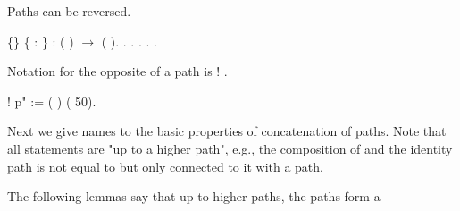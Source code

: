 \documentclass[12pt]{report}
\begin{document}
Paths can be reversed. \begin{coqdoccode}
\coqdocemptyline
\coqdocnoindent
{}  \{\} \{  : \} : (  ) \ensuremath{\rightarrow} (  ).\coqdoceol
\coqdocnoindent
{}.\coqdoceol
\coqdocindent{1.00em}
    .\coqdoceol
\coqdocindent{1.00em}
 .\coqdoceol
\coqdocindent{1.00em}
 .\coqdoceol
\coqdocnoindent
{}.\coqdoceol
\coqdocemptyline
\end{coqdoccode}
Notation for the opposite of a path  is ! . \begin{coqdoccode}
\coqdocemptyline
\coqdocnoindent
{}! p" := ( ) (  50).\coqdoceol
\coqdocemptyline
\end{coqdoccode}
Next we give names to the basic properties of concatenation of
   paths. Note that all statements are "up to a higher path", e.g.,
   the composition of  and the identity path is not equal to 
   but only connected to it with a path. \begin{coqdoccode}
\coqdocemptyline
\end{coqdoccode}
The following lemmas say that up to higher paths, the paths form a
\end{document}
